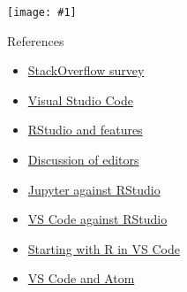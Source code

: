 \documentclass[
  11pt,
  ignorenonframetext,
  aspectratio=169]{beamer}
\providecommand{\tightlist}{%
  \setlength{\itemsep}{0pt}\setlength{\parskip}{0pt}}
\newcommand{\fullframegraphic}[1]{
  \texttt{[image: \#1]}
}
\newlength\beamerleftmargin
\begin{document}
\begin{frame}{}
\protect\hypertarget{section-12}{}
\vspace*{-10.6mm}\hspace*{-\beamerleftmargin}\hspace*{-1.5mm}
\fullframegraphic{"../captures/Capture d’écran (13)"}
\end{frame}

\begin{frame}{References}
\protect\hypertarget{references}{}
\small

\begin{itemize}
\tightlist
\item
  \href{https://insights.stackoverflow.com/survey/2019\#technology-_-most-popular-development-environments}{StackOverflow
  survey}
\item
  \href{https://code.visualstudio.com/docs/editor/whyvscode}{Visual
  Studio Code}
\item
  \href{https://rstudio.com/products/rstudio/features/}{RStudio and
  features}
\item
  \href{https://forums.fast.ai/t/text-editor-vs-jupyter-notebook-vs-ides/22069}{Discussion
  of editors}
\item
  \href{https://stackshare.io/stackups/jupyter-vs-rstudio}{Jupyter
  against RStudio}
\item
  \href{https://stackshare.io/stackups/rstudio-vs-visual-studio-code}{VS
  Code against RStudio}
\item
  \href{https://renkun.me/2019/12/11/writing-r-in-vscode-a-fresh-start/}{Starting
  with R in VS Code}
\item
  \href{https://www.makeuseof.com/tag/visual-studio-code-vs-atom/}{VS
  Code and Atom}
\end{itemize}
\end{frame}
\end{document}

